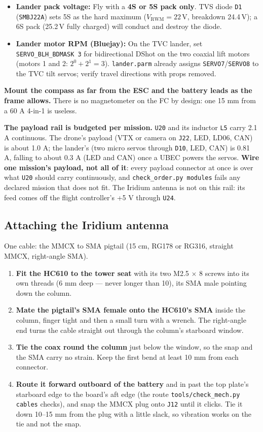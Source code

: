 \documentclass[11pt,a4paper]{article}
\newcommand{\file}[1]{\texttt{\small #1}}
\newcommand{\flag}[1]{\textcolor{warnred}{\textbf{#1}}}
\begin{document}
\begin{itemize}
from ArduPilot's coax frame.
\item \textbf{Lander pack voltage:} Fly with a \textbf{4S or 5S pack only}. TVS diode \file{D1}
(\file{SMBJ22A}) sets 5S as the hard maximum ($V_{\mathrm{RWM}} = 22$\,V, breakdown 24.4\,V); a 6S
pack (25.2\,V fully charged) will conduct and destroy the diode.
\item \textbf{Lander motor RPM (Bluejay):} On the TVC lander, set \file{SERVO\_BLH\_BDMASK 3}
for bidirectional DShot on the two coaxial lift motors (motors 1 and 2: $2^0 + 2^1 = 3$).
\file{lander.parm} already assigns \file{SERVO7}/\file{SERVO8} to the TVC tilt servos; verify travel
directions with props removed.
\end{itemize}

\textbf{Mount the compass as far from the ESC and the battery leads as the frame allows.}
There is no magnetometer on the FC by design: one 15 mm from a 60 A 4-in-1 is useless.

\textbf{The payload rail is budgeted per mission.} \file{U20} and its inductor \file{L5}
carry 2.1 A continuous. The drone's payload (VTX or camera on \file{J22}, LED, LD06, CAN) is
about 1.0 A; the lander's (two micro servos through \file{D10}, LED, CAN) is 0.81 A, falling to
about 0.3 A (LED and CAN) once a UBEC powers the servos. \flag{Wire one mission's
payload, not all of it}: every payload connector at once is over what \file{U20} should
carry continuously, and \file{check\_order.py modules} fails any declared mission that does not
fit. The Iridium antenna is not on this rail: its feed comes off the flight controller's
+5 V through \file{U24}.

\subsection{Attaching the Iridium antenna}

One cable: the MMCX to SMA pigtail (15 cm, RG178 or RG316, straight MMCX, right-angle SMA).

\begin{enumerate}
\item \textbf{Fit the HC610 to the tower seat} with its two M2.5 $\times$ 8 screws into its
own threads (6 mm deep --- never longer than 10), its SMA male pointing down the column.
\item \textbf{Mate the pigtail's SMA female onto the HC610's SMA} inside the column, finger
tight and then a small turn with a wrench. The right-angle end turns the cable straight
out through the column's starboard window.
\item \textbf{Tie the coax round the column} just below the window, so the snap and the SMA
carry no strain. Keep the first bend at least 10 mm from each connector.
\item \textbf{Route it forward outboard of the battery} and in past the top plate's starboard
edge to the board's aft edge (the route \file{tools/check\_mech.py cables} checks), and snap the
MMCX plug onto \file{J12} until it clicks. Tie it down 10--15 mm from the plug with a little
slack, so vibration works on the tie and not the snap.
\end{enumerate}
\end{document}
